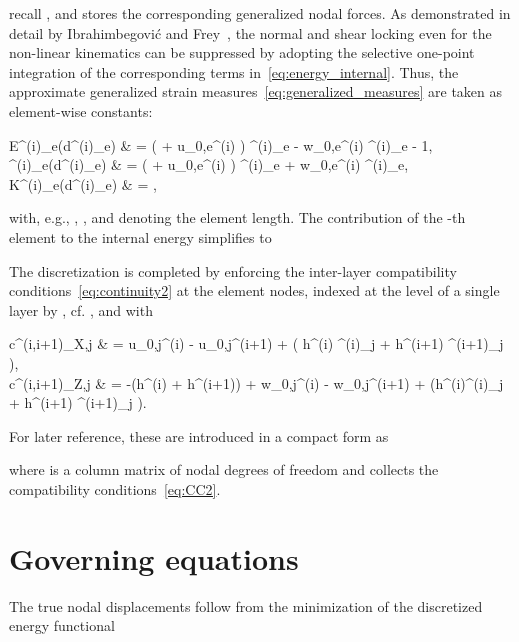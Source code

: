 \documentclass[11pt]{article}
\newcommand{\M}[1]{{\boldsymbol #1}}
\newcommand{\lay}[1]{^{(#1)}}
\newcommand{\rot}[1]{\varphi\lay{#1}}
\newcommand{\rote}[2]{\varphi\lay{#1}_{#2}}
\newcommand{\Drot}[2]{\Delta\rot{#1}_#2}
\newcommand{\h}[1]{h\lay{#1}}
\newcommand{\uce}[2]{u_{0,#2}\lay{#1}}
\newcommand{\Duc}[2]{\Delta u_{0,#2}\lay{#1}}
\newcommand{\wce}[2]{w_{0,#2}\lay{#1}}
\newcommand{\Dwc}[2]{\Delta w_{0,#2}\lay{#1}}
\newcommand{\Sc}[1]{E\lay{#1}}
\newcommand{\Kc}[1]{K\lay{#1}}
\newcommand{\Gc}[1]{\Gamma\lay{#1}}
\newcommand{\half}{\mbox{}}
\newcommand{\Mde}[2]{\Md^{(#1)}_{#2}}
\newcommand{\el}{e}
\newcommand{\Md}{\M{d}}
\begin{document}
recall , and  stores the corresponding
generalized nodal forces. As demonstrated in detail by Ibrahimbegovi\'{c} and
Frey~\cite{Ibrahimbegovic:1993:FEA}, the normal and shear locking even for the
non-linear kinematics can be suppressed by adopting the selective one-point
integration of the corresponding terms in~\eqref{eq:energy_internal}. Thus, the
approximate generalized strain measures~\eqref{eq:generalized_measures} are
taken as element-wise constants:

\Sc{i}_\el(\Mde{i}{\el})
& = 
\frac{1}{\eL{\el}{i}}
\left( 
\eL{\el}{i} 
+ 
\Duc{i}{\el} \right)
\cos \beta\lay{i}_\el 
- 
\frac{1}{\eL{\el}{i}}
\Dwc{i}{\el}
\sin \beta\lay{i}_\el
- 1,
\\
\Gc{i}_\el(\Mde{i}{\el}) 
& = 
\frac{1}{\eL{\el}{i}}
\left( \eL{\el}{i} + \Duc{i}{\el} \right)
\sin \beta\lay{i}_\el
+ \frac{1}{\eL{\el}{i}}
\Dwc{i}{\el}
\cos \beta\lay{i}_\el,
\label{eq:SFe}
\\
\Kc{i}_\el(\Mde{i}{\el}) 
& = 
\frac{\Drot{i}{\el}}{\eL{\el}{i}},

with, e.g., , 
, and
 denoting the element length. The contribution of the -th
element to the internal energy simplifies to


The discretization is completed by enforcing the inter-layer compatibility
conditions~\eqref{eq:continuity2} at the element nodes, 
indexed at the level of a
single layer by , cf. , and with

c\lay{i,i+1}_{X,j} 
& = 
\uce{i}{j}
-
\uce{i+1}{j}
+
\half ( \h{i}
\sin\rote{i}{j}
+
\h{i+1}
\sin\rote{i+1}{j}
),
\\ 
c\lay{i,i+1}_{Z,j} 
& = 
-\half(\h{i} + \h{i+1})
+
\wce{i}{j} - \wce{i+1}{j}
+
\half(\h{i}\cos\rote{i}{j}
+
\h{i+1} \cos\rote{i+1}{j} ).

For later reference, these are introduced in a compact form as

where  is a  column matrix of nodal degrees of freedom and 
collects the  compatibility conditions~\eqref{eq:CC2}.

\section{Governing equations}\label{sec:governing_equations}

The true nodal displacements  follow from the minimization of the
discretized energy functional
\end{document}
